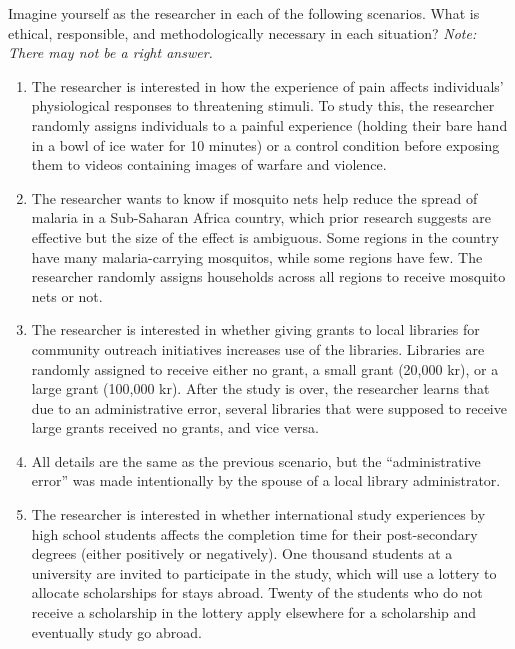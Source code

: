 \documentclass[12pt,a4]{article}
\begin{document}
\thispagestyle{empty}


\vspace{1em} 
\noindent Imagine yourself as the researcher in each of the following scenarios. What is ethical, responsible, and methodologically necessary in each situation? {\em Note: There may not be a right answer.}

\begin{enumerate}\itemsep1em

\item The researcher is interested in how the experience of pain affects individuals' physiological responses to threatening stimuli. To study this, the researcher randomly assigns individuals to a painful experience (holding their bare hand in a bowl of ice water for 10 minutes) or a control condition before exposing them to videos containing images of warfare and violence. %

\item The researcher wants to know if mosquito nets help reduce the spread of malaria in a Sub-Saharan Africa country, which prior research suggests are effective but the size of the effect is ambiguous. Some regions in the country have many malaria-carrying mosquitos, while some regions have few. The researcher randomly assigns households across all regions to receive mosquito nets or not. %

\item The researcher is interested in whether giving grants to local libraries for community outreach initiatives increases use of the libraries. Libraries are randomly assigned to receive either no grant, a small grant (20,000 kr), or a large grant (100,000 kr). After the study is over, the researcher learns that due to an administrative error, several libraries that were supposed to receive large grants received no grants, and vice versa. %

\item All details are the same as the previous scenario, but the ``administrative error'' was made intentionally by the spouse of a local library administrator.

\item The researcher is interested in whether international study experiences by high school students affects the completion time for their post-secondary degrees (either positively or negatively). One thousand students at a university are invited to participate in the study, which will use a lottery to allocate scholarships for stays abroad. Twenty of the students who do not receive a scholarship in the lottery apply elsewhere for a scholarship and eventually study go abroad. %


\end{enumerate}
\end{document}
